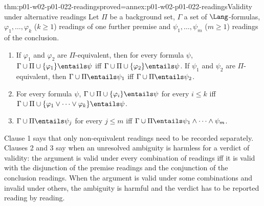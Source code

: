 \begin{hbtheorem}{thm:p01-w02-p01-022-readings}{proved=annex:p01-w02-p01-022-readings}{Validity under alternative readings}
Let \(\Pi\) be a background set, \(\Gamma\) a set of \(\Lang\)-formulas,
\(\varphi_1,\ldots,\varphi_k\) (\(k\geq1\)) readings of one further premise
and \(\psi_1,\ldots,\psi_m\) (\(m\geq1\)) readings of the conclusion.
\begin{enumerate}
  \item If \(\varphi_1\) and \(\varphi_2\) are \(\Pi\)-equivalent, then for
        every formula \(\psi\),
        \(\Gamma\cup\Pi\cup\{\varphi_1\}\entails\psi\) iff
        \(\Gamma\cup\Pi\cup\{\varphi_2\}\entails\psi\). If \(\psi_1\) and
        \(\psi_2\) are \(\Pi\)-equivalent, then
        \(\Gamma\cup\Pi\entails\psi_1\) iff \(\Gamma\cup\Pi\entails\psi_2\).
  \item For every formula \(\psi\),
        \(\Gamma\cup\Pi\cup\{\varphi_i\}\entails\psi\) for every
        \(i\leq k\) iff
        \(\Gamma\cup\Pi\cup\{\varphi_1\lor\cdots\lor\varphi_k\}\entails\psi\).
  \item \(\Gamma\cup\Pi\entails\psi_j\) for every \(j\leq m\) iff
        \(\Gamma\cup\Pi\entails\psi_1\land\cdots\land\psi_m\).
\end{enumerate}
\end{hbtheorem}

Clause 1 says that only non-equivalent readings need to be recorded
separately. Clauses 2 and 3 say when an unresolved ambiguity is harmless for
a verdict of validity: the argument is valid under every combination of
readings iff it is valid with the disjunction of the premise readings and the
conjunction of the conclusion readings. When the argument is valid under some
combinations and invalid under others, the ambiguity is harmful and the
verdict has to be reported reading by reading.

